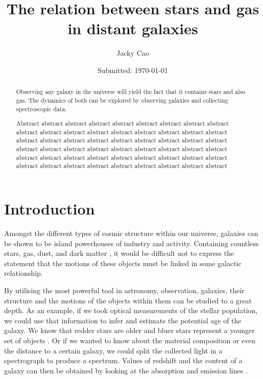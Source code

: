 \documentclass[12pt, twocolumn]{revtex4}    %
\begin{document}
                     


\title{The relation between stars and gas in distant galaxies} 
\date{Submitted: \today{}}
\author{Jacky Cao}

\begin{abstract}              
 
 Observing any galaxy in the universe will yield the fact that it contains stars and also gas. The dynamics of both can be explored by observing galaxies and collecting spectroscopic data. 
 
Abstract abstract abstract abstract abstract abstract abstract abstract abstract abstract abstract abstract abstract abstract abstract abstract abstract abstract abstract abstract abstract abstract abstract abstract abstract abstract abstract abstract abstract abstract abstract abstract abstract abstract abstract abstract abstract abstract abstract abstract abstract abstract abstract abstract abstract abstract abstract abstract abstract abstract abstract abstract abstract abstract 

\end{abstract}

\maketitle

\tableofcontents

\newpage

\section{Introduction} 

Amongst the different types of cosmic structure within our universe, galaxies can be shown to be island powerhouses of industry and activity. Containing countless stars, gas, dust, and dark matter \cite{carroll_astro}, it would be difficult not to express the statement that the motions of these objects must be linked in some galactic relationship. 

By utilising the most powerful tool in astronomy, observation, galaxies, their structure and the motions of the objects within them can be studied to a great depth. As an example, if we took optical measurements of the stellar population, we could use that information to infer and estimate the potential age of the galaxy. We know that redder stars are older and bluer stars represent a younger set of objects \cite{carroll_astro}. Or if we wanted to know about the material composition or even the distance to a certain galaxy, we could split the collected light in a spectrograph to produce a spectrum. Values of redshift and the content of a galaxy can then be obtained by looking at the absorption and emission lines \cite{carroll_astro}.
\end{document}
